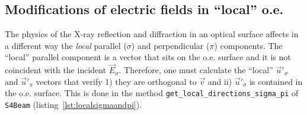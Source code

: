 \documentclass{iucr}
\begin{document}
\subsection{Modifications of electric fields in ``local'' o.e.}
\label{sec:localoe}


The physics of the X-ray reflection and diffraction in an optical surface affects in a different way 
the {\it local} parallel ($\sigma$) and perpendicular ($\pi$) components. The ``local'' parallel component
is a vector that sits on the o.e. surface and it is not coincident with the incident $\vec{E}_\sigma$.
Therefore, one must calculate the ``local'' $\vec{u}'_\sigma$ and $\vec{u}'_\pi$ vectors that verify
1) they are orthogonal to $\vec{v}$ and ii) $\vec{u}'_\sigma$ is contained in the o.e. surface. 
This is done in the method {\tt get\_local\_directions\_sigma\_pi} of {\tt S4Beam} (listing~\ref{lst:localsigmaandpi}).
\end{document}
